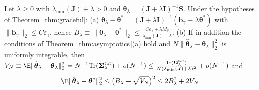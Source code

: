 \begin{theorem}
\label{thm:spectral}
Let $\lambda\ge0$ with $\lambda_{\min}(\boldsymbol J)+\lambda>0$ and $\boldsymbol\theta_\lambda=(\boldsymbol J+\lambda\boldsymbol I)^{-1}\boldsymbol S$. Under the hypotheses of Theorem~\ref{thm:graceful}:
(a) $\boldsymbol\theta_\lambda-\boldsymbol\theta^*=(\boldsymbol J+\lambda\boldsymbol I)^{-1}(\boldsymbol b_\gamma-\lambda\boldsymbol\theta^*)$ with $\|\boldsymbol b_\gamma\|_2\le C\varepsilon_\gamma$, hence
$B_\lambda\equiv\|\boldsymbol\theta_\lambda-\boldsymbol\theta^*\|_2\le\frac{C\varepsilon_\gamma+\lambda M_\theta}{\lambda_{\min}(\boldsymbol J)+\lambda}$.
(b) If in addition the conditions of Theorem~\ref{thm:asymptotics}(a) hold and $N\|\hat{\boldsymbol\theta}_\lambda-\boldsymbol\theta_\lambda\|_2^2$ is uniformly integrable, then
$V_N\equiv\E\|\hat{\boldsymbol\theta}_\lambda-\boldsymbol\theta_\lambda\|_2^2=N^{-1}\mathrm{Tr}(\boldsymbol\Sigma^{\rm tot}_\lambda)+o(N^{-1})\le\frac{\mathrm{Tr}(\boldsymbol\Omega^{\rm tot}_\lambda)}{N(\lambda_{\min}(\boldsymbol J)+\lambda)^2}+o(N^{-1})$
and
\[
\E\|\hat{\boldsymbol\theta}_\lambda-\boldsymbol\theta^*\|_2^2\le\big(B_\lambda+\sqrt{V_N}\big)^2\le 2B_\lambda^2+2V_N .
\]
\end{theorem}

